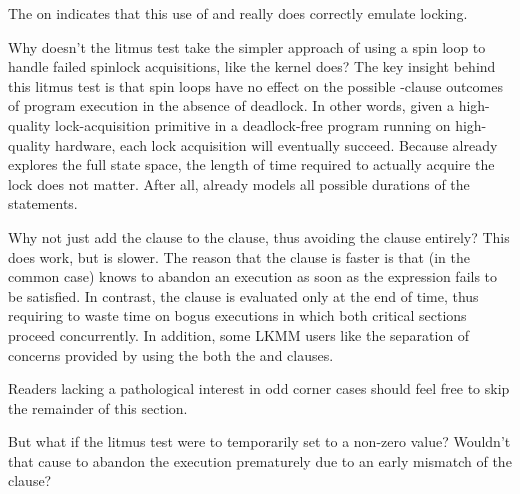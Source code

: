 \begin{fcvref}
The  on  indicates that this use of 
and  really does correctly emulate locking.
\end{fcvref}

Why doesn't the litmus test take the simpler approach of using a spin loop
to handle failed spinlock acquisitions, like the kernel does?
The key insight behind this litmus test is that spin loops have no effect
on the possible -clause outcomes of program execution in the absence
of deadlock.
In other words, given a high-quality lock-acquisition primitive in a
deadlock-free program running on high-quality hardware, each lock
acquisition will eventually succeed.
Because  already explores the full state space, the length of
time required to actually acquire the lock does not matter.
After all,  already models all possible durations of the
 statements.

Why not just add the  clause to the  clause, thus
avoiding the  clause entirely?
This does work, but is slower.
The reason that the  clause is faster is that (in the common case)
 knows to abandon an execution as soon as the  expression
fails to be satisfied.
In contrast, the  clause is evaluated only at the end of time,
thus requiring  to waste time on bogus executions in which both
critical sections proceed concurrently.
In addition, some LKMM users like the separation of concerns provided by
using the both the  and  clauses.

Readers lacking a pathological interest in odd corner cases should feel
free to skip the remainder of this section.

But what if the litmus test were to temporarily set  to a non-zero
value?
Wouldn't that cause  to abandon the execution prematurely
due to an early mismatch of the  clause?

